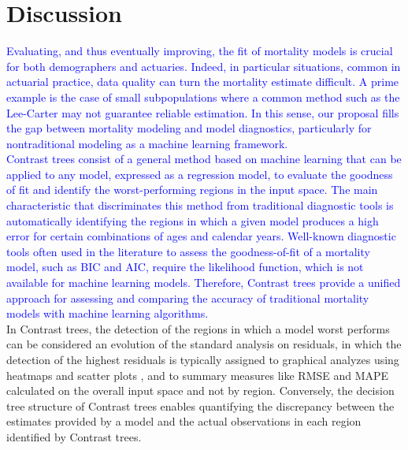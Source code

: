 \documentclass[fleqn,10pt]{wlscirep}
\begin{document}

\section*{Discussion}
\textcolor{blue}{Evaluating, and thus eventually improving, the fit of mortality models is crucial for both demographers and actuaries. 
Indeed, in particular situations, common in actuarial practice, data quality can turn the mortality estimate difficult. 
A prime example is the case of small subpopulations where a common method such as the Lee-Carter may not guarantee reliable estimation. In this sense, our proposal fills the gap between mortality modeling and model diagnostics, particularly for nontraditional modeling as a machine learning framework.\\
Contrast trees consist of a general method based on machine learning that can be applied to any model, expressed as a regression model, to evaluate the goodness of fit and identify the worst-performing regions in the input space. The main characteristic that discriminates this method from traditional diagnostic tools is automatically identifying the regions in which a given model produces a high error for certain combinations of ages and calendar years.
Well-known diagnostic tools often used in the literature to assess the goodness-of-fit of a mortality model, such as BIC and AIC, require the likelihood function, which is not available for machine learning models. Therefore, Contrast trees provide a unified approach for assessing and comparing the accuracy of traditional mortality models with machine learning algorithms.}\\
In Contrast trees, the detection of the regions in which a model worst performs can be considered an evolution of the standard analysis on residuals, in which the detection of the highest residuals is typically assigned to graphical analyzes using heatmaps and scatter plots \cite{CBD09,Villegas2018}, and to summary measures like RMSE and MAPE calculated on the overall input space and not by region.
Conversely, the decision tree structure of Contrast trees enables quantifying the discrepancy between the estimates provided by a model and the actual observations in each region identified by Contrast trees.
\end{document}

